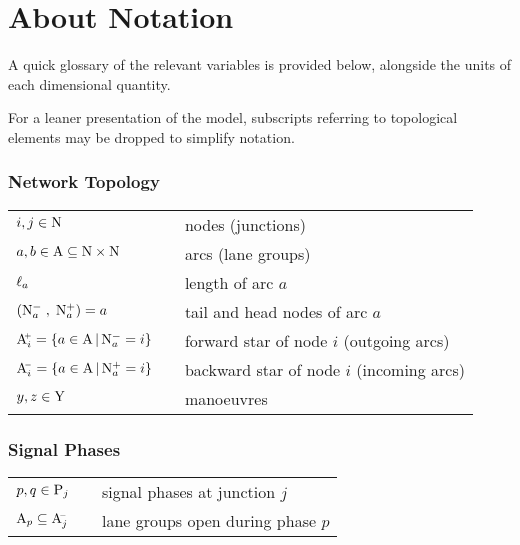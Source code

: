 \pagebreak
\section*{About Notation}
A quick glossary of the relevant variables is provided below, alongside the units of each dimensional quantity.

For a leaner presentation of the model, subscripts referring to
topological elements may be dropped to simplify notation.

\subsubsection*{Network Topology}
\begin{tabu} to \textwidth {X[3,c] X[1,c] X[6,l]}
$i,j \in \mathrm{N}$ & & nodes (junctions) \\[2pt]

$a,b \in \mathrm{A} \subseteq \mathrm{N} \times \mathrm{N} $ & & arcs (lane groups) \\[2pt]

$\ell_a$ &  & length of arc $a$ \\[2pt]

$\left( \mathrm{N}_{a}^{-} \; , \;\mathrm{N}_{a}^{+} \right) = a$ & & tail and head nodes of arc $a$ \\[2pt]

$\mathrm{A}_{i}^{\scriptscriptstyle{\hspace{-2pt}+}} = \left\lbrace a \in \mathrm{A} \, | \, \mathrm{N}_{a}^{-} = i \right\rbrace $ & & forward star of node $i$ (outgoing arcs)\\[2pt]

$\mathrm{A}_{i}^{\scriptscriptstyle{\hspace{-2pt}-}} = \left\lbrace a \in \mathrm{A} \, | \, \mathrm{N}_{a}^{+} = i \right\rbrace $ & & backward star of node $i$ (incoming arcs)\\[2pt]

$y,z \in \mathrm{Y}$ & & manoeuvres\\

\end{tabu} 


\subsubsection*{Signal Phases}
\begin{tabu} to \textwidth {X[3,c] X[1,c] X[6,l]}
$p,q \in \mathrm{P}_{j}$ & & signal phases at junction $j$\\[2pt]

$\mathrm{A}_{p} \subseteq \mathrm{A}_{j}^{\scriptscriptstyle{\hspace{-2pt}-}} $ & & lane groups open during phase $p$ \\[2pt]

\end{tabu} 


